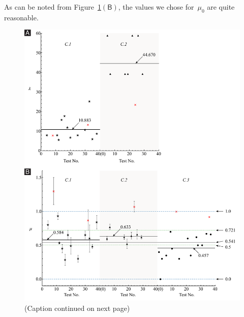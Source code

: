 \documentclass[preprint,10pt,times]{elsarticle}
\numberwithin{equation}{section}
\newcommand{\pr}[1]{\left( #1 \right)}
\newcommand{\subf}[1]{\pr{\textsf{#1}}}
\begin{document}
As can be noted from Figure~\ref{fig:Distribution}$\subf{B}$, the
values we chose for~$\mu_0$ are quite reasonable.

\begin{figure}
\begin{centering}
\includegraphics[width=1\textwidth]{../Figures_Submit/Distribution_V2.pdf}
\par\end{centering}
\centering{}
\caption{(Caption continued on next page)}
\label{fig:Distribution}
\end{figure}
\end{document}
